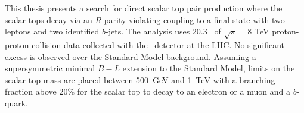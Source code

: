 
This thesis presents a search for direct scalar top pair production where
the scalar tops decay via an $R$-parity-violating coupling to a
final state with two leptons and two identified $b$-jets.
The analysis uses 20.3 \ifb\ of $\sqrt{s} = 8$ TeV proton-proton
collision data collected with the \atlas\ detector at the LHC.
No significant excess is observed over the Standard Model background.
Assuming a supersymmetric minimal $B-L$ extension to the Standard Model,
limits on the scalar top mass are placed between 500~GeV and 1~TeV with a
branching fraction above 20\% for the scalar top to decay to an
electron or a muon and a $b$-quark.

